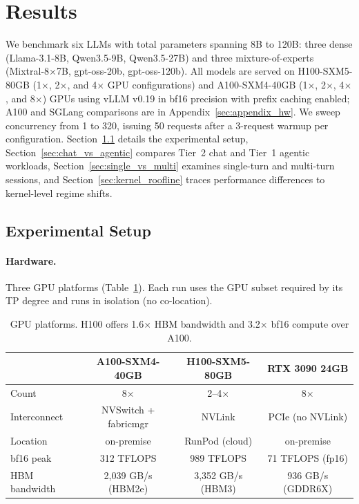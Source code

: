 \section{Results}
\label{sec:results}

We benchmark six LLMs with total parameters spanning 8B to 120B: three dense (Llama-3.1-8B, Qwen3.5-9B, Qwen3.5-27B) and three mixture-of-experts (Mixtral-8$\times$7B, gpt-oss-20b, gpt-oss-120b). All models are served on H100-SXM5-80GB (1$\times$, 2$\times$, and 4$\times$ GPU configurations) and A100-SXM4-40GB (1$\times$, 2$\times$, 4$\times$, and 8$\times$) GPUs using vLLM v0.19 in bf16 precision with prefix caching enabled; A100 and SGLang comparisons are in Appendix~\ref{sec:appendix_hw}. We sweep concurrency from 1 to 320, issuing 50 requests after a 3-request warmup per configuration. Section~\ref{sec:setup} details the experimental setup, Section~\ref{sec:chat_vs_agentic} compares Tier~2 chat and Tier~1 agentic workloads, Section~\ref{sec:single_vs_multi} examines single-turn and multi-turn sessions, and Section~\ref{sec:kernel_roofline} traces performance differences to kernel-level regime shifts.

\subsection{Experimental Setup}
\label{sec:setup}

\paragraph{Hardware.} Three GPU platforms (Table~\ref{tab:hardware}). Each run uses the GPU subset required by its TP degree and runs in isolation (no co-location).

\begin{table}[h]
\caption{GPU platforms. H100 offers 1.6$\times$ HBM bandwidth and 3.2$\times$ bf16 compute over A100.}
\label{tab:hardware}
\centering
\small
\begin{tabular}{lccc}
\toprule
 & \textbf{A100-SXM4-40GB} & \textbf{H100-SXM5-80GB} & \textbf{RTX 3090 24GB} \\
\midrule
Count         & 8$\times$               & 2--4$\times$           & 8$\times$          \\
Interconnect  & NVSwitch + fabricmgr    & NVLink                 & PCIe (no NVLink)   \\
Location      & on-premise              & RunPod (cloud)         & on-premise         \\
bf16 peak     & 312 TFLOPS              & 989 TFLOPS             & 71 TFLOPS (fp16)   \\
HBM bandwidth & 2{,}039 GB/s (HBM2e)    & 3{,}352 GB/s (HBM3)    & 936 GB/s (GDDR6X)  \\
\bottomrule
\end{tabular}
\end{table}

